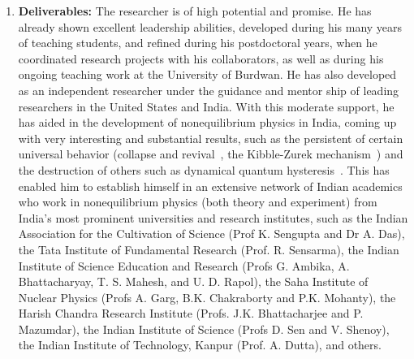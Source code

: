 \documentclass[a4paper,11pt,color]{article}
\begin{document}
\begin{enumerate}[label=(\alph*)]
\item
\textbf{Deliverables:}
The researcher is of high potential and promise. He has already shown excellent leadership abilities, developed during his many years of teaching students, and refined during his postdoctoral years, when he coordinated research projects with his collaborators, as well as during his ongoing teaching work at the University of Burdwan. He has also developed as an independent researcher under the guidance and mentor ship of leading researchers in the United States and India. With this moderate support, he has aided in the development of nonequilibrium physics in India, coming up with very interesting and substantial results, such as the persistent of certain universal behavior (collapse and revival~\cite{colrev}, the Kibble-Zurek mechanism~\cite{fermidyn}) and 
the destruction of others such as dynamical quantum hysteresis~\cite{fermidyn}. This 
has enabled him to establish himself in an extensive network of Indian academics who work in nonequilibrium physics (both theory and experiment) from India's most prominent universities and research institutes, such as the Indian Association for the Cultivation of Science (Prof K. Sengupta and Dr A. Das), the Tata Institute of Fundamental Research (Prof. R. Sensarma), the Indian Institute of Science Education and Research (Profs G. Ambika,  A. Bhattacharyay,  T. S. Mahesh, and U. D. Rapol), the Saha Institute of Nuclear Physics (Profs A. Garg, B.K. Chakraborty and P.K. Mohanty), the Harish Chandra Research Institute (Profs. J.K. Bhattacharjee and P. Mazumdar), the Indian Institute of Science (Profs D. Sen and V. Shenoy), the Indian Institute of Technology, Kanpur (Prof. A. Dutta), and others.


\end{enumerate}
\end{document}
